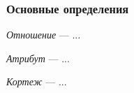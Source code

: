 \begin{frame}

\frametitle{Основные определения}

\emph{Отношение} --- ...

\emph{Атрибут} --- ...

\emph{Кортеж} --- ...

\end{frame}

